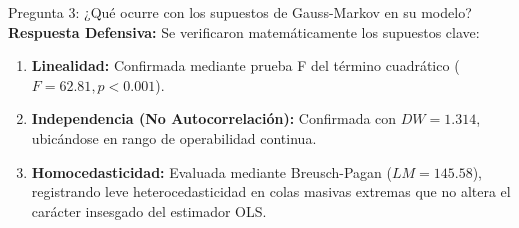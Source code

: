 \documentclass[12pt,letterpaper]{article}
\begin{document}
\begin{summarybox}{Pregunta 3: ¿Qué ocurre con los supuestos de Gauss-Markov en su modelo?}
	\textbf{Respuesta Defensiva:} Se verificaron matemáticamente los supuestos clave:
	\begin{enumerate}
		\item \textbf{Linealidad:} Confirmada mediante prueba F del término cuadrático ($F = 62.81, p < 0.001$).
		\item \textbf{Independencia (No Autocorrelación):} Confirmada con $DW = 1.314$, ubicándose en rango de operabilidad continua.
		\item \textbf{Homocedasticidad:} Evaluada mediante Breusch-Pagan ($LM = 145.58$), registrando leve heterocedasticidad en colas masivas extremas que no altera el carácter insesgado del estimador OLS.
	\end{enumerate}
\end{summarybox}
\end{document}
